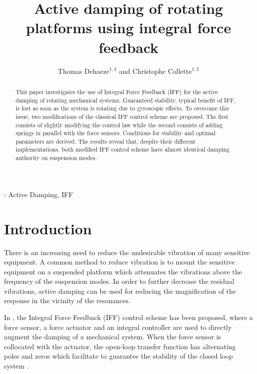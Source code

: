 \documentclass[10pt]{iopart}
\begin{document}
\title{Active damping of rotating platforms using integral force feedback}
\author{Thomas Dehaeze$^{1,3}$ and Christophe Collette$^{1,2}$}
\address{$^1$ Precision Mechatronics Laboratory, University of Liege, Belgium}
\address{$^2$ BEAMS Department, Free University of Brussels, Belgium}
\address{$^3$ European Synchrotron Radiation Facility, Grenoble, France}

\begin{abstract}
This paper investigates the use of Integral Force Feedback (IFF) for the active damping of rotating mechanical systems.
Guaranteed stability, typical benefit of IFF, is lost as soon as the system is rotating due to gyroscopic effects.
To overcome this issue, two modifications of the classical IFF control scheme are proposed.
The first consists of slightly modifying the control law while the second consists of adding springs in parallel with the force sensors.
Conditions for stability and optimal parameters are derived.
The results reveal that, despite their different implementations, both modified IFF control scheme have almost identical damping authority on suspension modes.
\end{abstract}

\vspace{2pc}
: Active Damping, IFF

\submitto{\SMS}
\maketitle

\section{Introduction}
\label{sec:orgdf2365d}
\label{sec:introduction}
There is an increasing need to reduce the undesirable vibration of many sensitive equipment.
A common method to reduce vibration is to mount the sensitive equipment on a suspended platform which attenuates the vibrations above the frequency of the suspension modes.
In order to further decrease the residual vibrations, active damping can be used for reducing the magnification of the response in the vicinity of the resonances.

In \cite{preumont92_activ_dampin_by_local_force}, the Integral Force Feedback (IFF) control scheme has been proposed, where a force sensor, a force actuator and an integral controller are used to directly augment the damping of a mechanical system.
When the force sensor is collocated with the actuator, the open-loop transfer function has alternating poles and zeros which facilitate to guarantee the stability of the closed loop system \cite{preumont02_force_feedb_versus_accel_feedb}.
\end{document}
